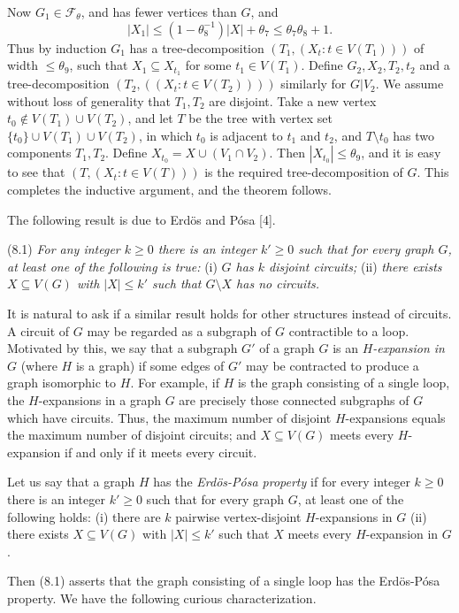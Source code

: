Now $G_1 \in \mathcal{F}_\theta$, and has fewer vertices than $G$, and
\begin{equation*}
|X_1| \le (1 - \theta_8^{-1})|X| + \theta_7 \le \theta_7 \theta_8 + 1.
\end{equation*}
Thus by induction $G_1$ has a tree-decomposition $(T_1, (X_t : t \in V(T_1)))$ of width $\le \theta_9$, such that $X_1 \subseteq X_{t_1}$ for some $t_1 \in V(T_1)$. Define $G_2, X_2, T_2, t_2$ and a tree-decomposition $(T_2, ((X_t : t \in V(T_2))))$ similarly for $G | V_2$. We assume without loss of generality that $T_1, T_2$ are disjoint. Take a new vertex $t_0 \notin V(T_1) \cup V(T_2)$, and let $T$ be the tree with vertex set $\{t_0\} \cup V(T_1) \cup V(T_2)$, in which $t_0$ is adjacent to $t_1$ and $t_2$, and $T \setminus t_0$ has two components $T_1, T_2$. Define $X_{t_0} = X \cup (V_1 \cap V_2)$. Then $|X_{t_0}| \le \theta_9$, and it is easy to see that $(T, (X_t : t \in V(T)))$ is the required tree-decomposition of $G$. This completes the inductive argument, and the theorem follows.


The following result is due to Erd\"os and P\'osa [4].

\stmt
(8.1) \textit{For any integer $k \ge 0$ there is an integer $k' \ge 0$ such that for every graph $G$, at least one of the following is true:} (i) \textit{$G$ has $k$ disjoint circuits;} (ii) \textit{there exists $X \subseteq V(G)$ with $|X| \le k'$ such that $G \setminus X$ has no circuits.}

It is natural to ask if a similar result holds for other structures instead of circuits. A circuit of $G$ may be regarded as a subgraph of $G$ contractible to a loop. Motivated by this, we say that a subgraph $G'$ of a graph $G$ is an \textit{$H$-expansion in $G$} (where $H$ is a graph) if some edges of $G'$ may be contracted to produce a graph isomorphic to $H$. For example, if $H$ is the graph consisting of a single loop, the $H$-expansions in a graph $G$ are precisely those connected subgraphs of $G$ which have circuits. Thus, the maximum number of disjoint $H$-expansions equals the maximum number of disjoint circuits; and $X \subseteq V(G)$ meets every $H$-expansion if and only if it meets every circuit.

Let us say that a graph $H$ has the \textit{Erd\"os-P\'osa property} if for every integer $k \ge 0$ there is an integer $k' \ge 0$ such that for every graph $G$, at least one of the following holds: (i) there are $k$ pairwise vertex-disjoint $H$-expansions in $G$ (ii) there exists $X \subseteq V(G)$ with $|X| \le k'$ such that $X$ meets every $H$-expansion in $G$.

Then (8.1) asserts that the graph consisting of a single loop has the Erd\"os-P\'osa property. We have the following curious characterization.
